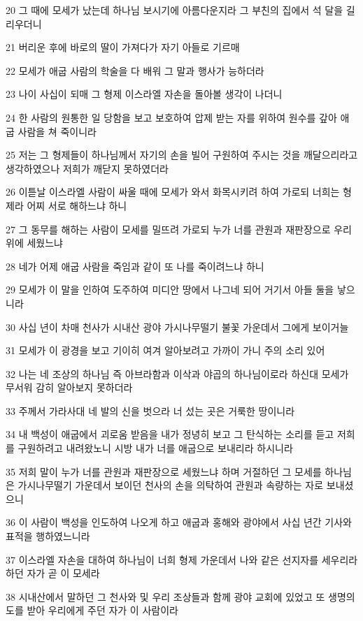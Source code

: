 \par 20 그 때에 모세가 났는데 하나님 보시기에 아름다운지라 그 부친의 집에서 석 달을 길리우더니
\par 21 버리운 후에 바로의 딸이 가져다가 자기 아들로 기르매
\par 22 모세가 애굽 사람의 학술을 다 배워 그 말과 행사가 능하더라
\par 23 나이 사십이 되매 그 형제 이스라엘 자손을 돌아볼 생각이 나더니
\par 24 한 사람의 원통한 일 당함을 보고 보호하여 압제 받는 자를 위하여 원수를 갚아 애굽 사람을 쳐 죽이니라
\par 25 저는 그 형제들이 하나님께서 자기의 손을 빌어 구원하여 주시는 것을 깨달으리라고 생각하였으나 저희가 깨닫지 못하였더라
\par 26 이튿날 이스라엘 사람이 싸울 때에 모세가 와서 화목시키려 하여 가로되 너희는 형제라 어찌 서로 해하느냐 하니
\par 27 그 동무를 해하는 사람이 모세를 밀뜨려 가로되 누가 너를 관원과 재판장으로 우리 위에 세웠느냐
\par 28 네가 어제 애굽 사람을 죽임과 같이 또 나를 죽이려느냐 하니
\par 29 모세가 이 말을 인하여 도주하여 미디안 땅에서 나그네 되어 거기서 아들 둘을 낳으니라
\par 30 사십 년이 차매 천사가 시내산 광야 가시나무떨기 불꽃 가운데서 그에게 보이거늘
\par 31 모세가 이 광경을 보고 기이히 여겨 알아보려고 가까이 가니 주의 소리 있어
\par 32 나는 네 조상의 하나님 즉 아브라함과 이삭과 야곱의 하나님이로라 하신대 모세가 무서워 감히 알아보지 못하더라
\par 33 주께서 가라사대 네 발의 신을 벗으라 너 섰는 곳은 거룩한 땅이니라
\par 34 내 백성이 애굽에서 괴로움 받음을 내가 정녕히 보고 그 탄식하는 소리를 듣고 저희를 구원하려고 내려왔노니 시방 내가 너를 애굽으로 보내리라 하시니라
\par 35 저희 말이 누가 너를 관원과 재판장으로 세웠느냐 하며 거절하던 그 모세를 하나님은 가시나무떨기 가운데서 보이던 천사의 손을 의탁하여 관원과 속량하는 자로 보내셨으니
\par 36 이 사람이 백성을 인도하여 나오게 하고 애굽과 홍해와 광야에서 사십 년간 기사와 표적을 행하였느니라
\par 37 이스라엘 자손을 대하여 하나님이 너희 형제 가운데서 나와 같은 선지자를 세우리라 하던 자가 곧 이 모세라
\par 38 시내산에서 말하던 그 천사와 및 우리 조상들과 함께 광야 교회에 있었고 또 생명의 도를 받아 우리에게 주던 자가 이 사람이라
